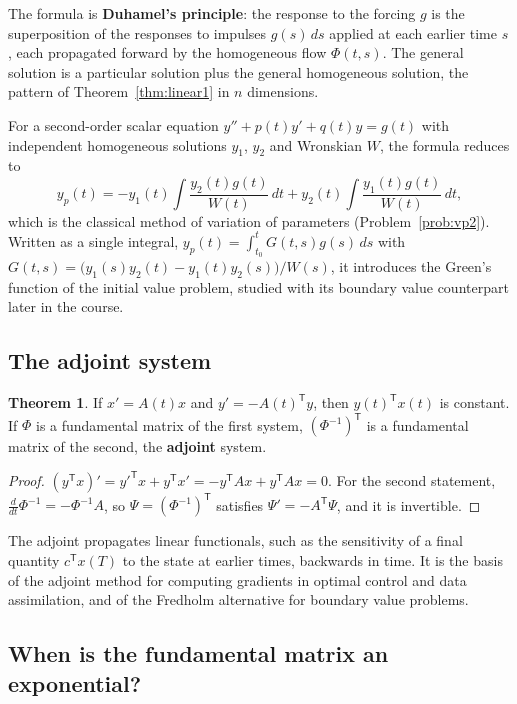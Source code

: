 \documentclass[11pt,a4paper]{article}
\numberwithin{equation}{section}
\theoremstyle{definition}
\newtheorem{thm}{Theorem}[subsection]
\begin{document}
The formula is \textbf{Duhamel's principle}: the response to the forcing $g$ is the superposition of the responses to impulses $g(s)\,ds$ applied at each earlier time $s$, each
propagated forward by the homogeneous flow $\Phi(t, s)$. The general solution is a particular solution plus the general homogeneous solution, the pattern of
Theorem~\ref{thm:linear1} in $n$ dimensions.

For a second-order scalar equation $y'' + p(t)y' + q(t)y = g(t)$ with independent homogeneous solutions $y_1$, $y_2$ and Wronskian $W$, the formula reduces to
\[
y_p(t) = -y_1(t)\int\frac{y_2(t)g(t)}{W(t)}\,dt + y_2(t)\int\frac{y_1(t)g(t)}{W(t)}\,dt ,
\]
which is the classical method of variation of parameters (Problem~\ref{prob:vp2}). Written as a single integral, $y_p(t) = \int_{t_0}^tG(t, s)g(s)\,ds$ with
$G(t, s) = \bigl(y_1(s)y_2(t) - y_1(t)y_2(s)\bigr)/W(s)$, it introduces the Green's function of the initial value problem, studied with its boundary value counterpart later in the course.

\subsection{The adjoint system}
\label{ssec:adjoint}

\begin{thm}
\label{thm:adjoint}
If $x' = A(t)x$ and $y' = -A(t)^{\mathsf T}y$, then $y(t)^{\mathsf T}x(t)$ is constant. If $\Phi$ is a fundamental matrix of the first system, $(\Phi^{-1})^{\mathsf T}$ is a fundamental matrix of the second,
the \textbf{adjoint} system.
\end{thm}

\begin{proof}
$(y^{\mathsf T}x)' = y'^{\mathsf T}x + y^{\mathsf T}x' = -y^{\mathsf T}Ax + y^{\mathsf T}Ax = 0$. For the second statement, $\frac{d}{dt}\Phi^{-1} = -\Phi^{-1}A$, so $\Psi = (\Phi^{-1})^{\mathsf T}$ satisfies $\Psi' = -A^{\mathsf T}\Psi$, and it is invertible.
\end{proof}

The adjoint propagates linear functionals, such as the sensitivity of a final quantity $c^{\mathsf T}x(T)$ to the state at earlier times, backwards in time. It is the basis of the adjoint
method for computing gradients in optimal control and data assimilation, and of the Fredholm alternative for boundary value problems.

\subsection{When is the fundamental matrix an exponential?}
\label{ssec:commute}
\end{document}
